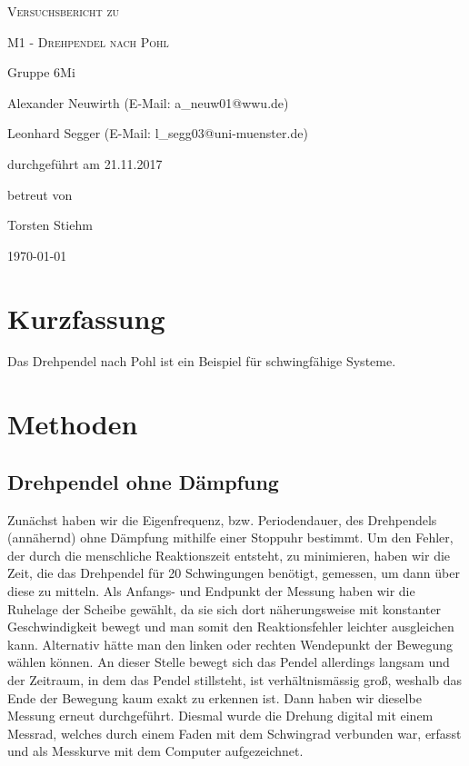 \documentclass[
	a4paper,
	12pt,
	pagesize,
	ngerman
]{scrartcl}
\begin{document}
	
	\begin{titlepage}
		\centering
		{\scshape\LARGE Versuchsbericht zu \par}
		\vspace{1cm}
		{\scshape\huge M1 - Drehpendel nach Pohl\par}
		\vspace{2.5cm}
		{\LARGE Gruppe 6Mi \par}
		\vspace{0.5cm}
		
		{\large Alexander Neuwirth (E-Mail: a\_neuw01@wwu.de) \par}
		{\large Leonhard Segger (E-Mail: l\_segg03@uni-muenster.de) \par}
		\vfill
		
		durchgeführt am 21.11.2017\par
		betreut von\par
		{\large Torsten Stiehm}
		
		\vfill
		
		{\large \today\par}
	\end{titlepage}
	\tableofcontents
	\newpage
	
	\section{Kurzfassung}
	Das Drehpendel nach Pohl ist ein Beispiel für schwingfähige Systeme.
	\section{Methoden}
	
	\subsection{Drehpendel ohne Dämpfung}%
	Zunächst haben wir die Eigenfrequenz, bzw. Periodendauer, des Drehpendels (annähernd) ohne Dämpfung mithilfe einer Stoppuhr bestimmt. Um den Fehler, der durch die menschliche Reaktionszeit entsteht, zu minimieren, haben wir die Zeit, die das Drehpendel für 20 Schwingungen benötigt, gemessen, um dann über diese zu mitteln.
	Als Anfangs- und Endpunkt der Messung haben wir die Ruhelage der Scheibe gewählt, da sie sich dort näherungsweise mit konstanter Geschwindigkeit bewegt und man somit den Reaktionsfehler leichter ausgleichen kann.
	Alternativ hätte man den linken oder rechten Wendepunkt der Bewegung wählen können. An dieser Stelle bewegt sich das Pendel allerdings langsam und der Zeitraum, in dem das Pendel stillsteht, ist verhältnismässig groß, weshalb das Ende der Bewegung kaum exakt zu erkennen ist. %
	Dann haben wir dieselbe Messung erneut durchgeführt. Diesmal wurde die Drehung digital mit einem Messrad, welches durch einem Faden mit dem Schwingrad verbunden war, erfasst und als Messkurve mit dem Computer aufgezeichnet.%
\end{document}
